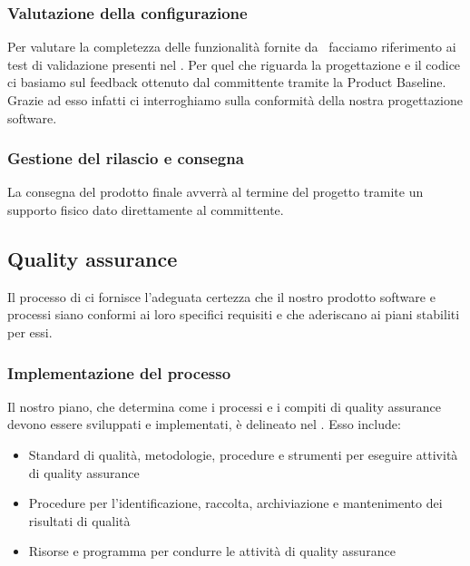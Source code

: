 	\subsubsection{Valutazione della configurazione}
	\label{ValutazioneConfigurazione}
	Per valutare la completezza delle funzionalità fornite da \progetto\ facciamo riferimento ai test di validazione presenti nel \PdQd.
	Per quel che riguarda la progettazione e il codice ci basiamo sul feedback ottenuto dal committente tramite la Product Baseline. Grazie ad esso infatti ci interroghiamo sulla conformità della nostra progettazione software.

	\subsubsection{Gestione del rilascio e consegna}	\label{GestioneRilascio}
	La consegna del prodotto finale avverrà al termine del progetto tramite un supporto fisico dato direttamente al committente.


	\subsection{Quality assurance}	\label{QualityAssurance}
	Il processo di  ci fornisce l'adeguata certezza che il nostro prodotto software e processi siano conformi ai loro specifici requisiti e che aderiscano ai piani stabiliti per essi.

		\subsubsection{Implementazione del processo} \label{ImplementazioneQA}
		Il nostro piano, che determina come i processi e i compiti di quality assurance devono essere sviluppati e implementati, è delineato nel \PdQd.
		Esso include:
		\begin{itemize}
			\item Standard di qualità, metodologie, procedure e strumenti per eseguire attività di quality assurance
			\item Procedure per l'identificazione, raccolta, archiviazione e mantenimento dei risultati di qualità
			\item Risorse e programma per condurre le attività di quality assurance
		\end{itemize}

